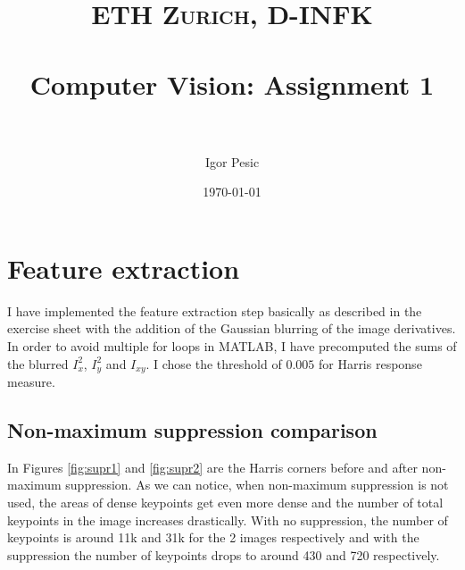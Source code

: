 \documentclass[paper=a4, fontsize=11pt]{scrartcl} %
\title{	
\normalfont \normalsize 
\textsc{ETH Zurich, D-INFK} \\ [25pt] %
\horrule{0.5pt} \\[0.4cm] %
\huge Computer Vision: Assignment 1 \\ %
\horrule{2pt} \\[0.5cm] %
}
\author{Igor Pesic} %
\date{\normalsize\today} %
\numberwithin{equation}{section} %
\numberwithin{figure}{section} %
\numberwithin{table}{section} %
\begin{document}
\maketitle %


\section{Feature extraction}


I have implemented the feature extraction step basically as described in the exercise sheet with the addition of the Gaussian blurring of the image derivatives. In order to avoid multiple for loops in MATLAB, I have precomputed the sums of the blurred  $I_{x}^2$, $I_{y}^2$ and $I_{xy}$. I chose the threshold of $0.005$ for Harris response measure. 


\subsection{Non-maximum suppression comparison}

In Figures \ref{fig:supr1} and \ref{fig:supr2} are the Harris corners before and after non-maximum suppression. As we can notice, when non-maximum suppression is not used, the areas of dense keypoints get even more dense and the number of total keypoints in the image increases drastically. With no suppression, the number of keypoints is around 11k and 31k for the 2 images respectively and with the suppression the number of keypoints drops to around 430 and 720 respectively.
\end{document}
